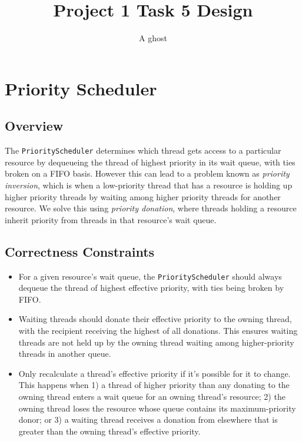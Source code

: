 \documentclass[11pt]{article}
\title{Project 1 Task 5 Design}
\author{A ghost}
\begin{document}
\lstset{language=Python}
\maketitle

\section{Priority Scheduler}

\subsection{Overview}
The \texttt{PriorityScheduler} determines which thread gets access to a particular resource by dequeueing the thread of highest priority in its wait queue, with ties broken on a FIFO basis. However this can lead to a problem known as \textit{priority inversion}, which is when a low-priority thread that has a resource is holding up higher priority threads by waiting among higher priority threads for another resource. We solve this using \textit{priority donation}, where threads holding a resource inherit priority from threads in that resource's wait queue.

\subsection{Correctness Constraints}
\begin{itemize}
\item For a given resource's wait queue, the \texttt{PriorityScheduler} should always dequeue the thread of highest effective priority, with ties being broken by FIFO.
\item Waiting threads should donate their effective priority to the owning thread, with the recipient receiving the highest of all donations. This ensures waiting threads are not held up by the owning thread waiting among higher-priority threads in another queue.
\item Only recalculate a thread's effective priority if it's possible for it to change. This happens when 1) a thread of higher priority than any donating to the owning thread enters a wait queue for an owning thread's resource; 2) the owning thread loses the resource whose queue contains its maximum-priority donor; or 3) a waiting thread receives a donation from elsewhere that is greater than the owning thread's effective priority.
\end{itemize}
\end{document}
